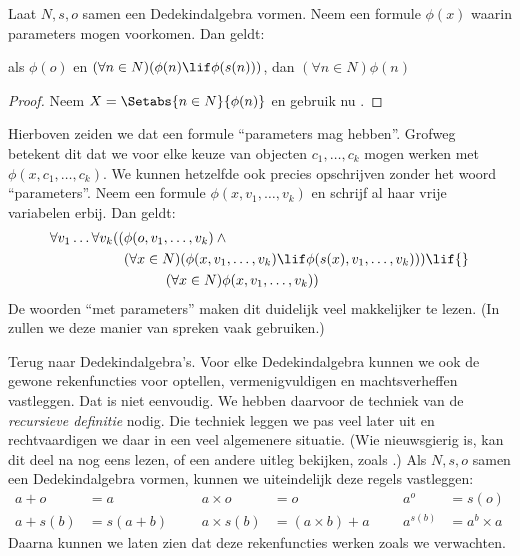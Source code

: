 \documentclass[openany]{memoir}
\begin{document}
\begin{cor}
Laat $N, s, o$ samen een Dedekindalgebra vormen. Neem een formule
$\phi(x)$ waarin parameters mogen voorkomen. Dan geldt:
\begin{center}
	als $\phi(o)$ en $(\forall {n} \in N)(\phi(n)\lif
	\phi({s}({n})))$, {dan} $(\forall n \in N)\phi(n)$
\end{center}
\end{cor}

\begin{proof}
Neem $X = \Setabs{n \in N}{\phi(n)}$ en gebruik nu
.
\end{proof}

Hierboven zeiden we dat een formule ``parameters mag hebben''. Grofweg
betekent dit dat we voor elke keuze van objecten $c_1, \ldots, c_k$
mogen werken met $\phi(x, c_1, \ldots, c_k)$. We kunnen hetzelfde ook
precies opschrijven zonder het woord ``parameters''. Neem een formule
$\phi(x, v_1, \ldots, v_k)$ en schrijf al haar vrije variabelen erbij.
Dan geldt:
	\begin{align*}
			\forall v_1 \ldots \forall v_k((&\phi(o, v_1,\ldots, v_k) \land {}\\
			&	(\forall x \in N)(\phi(x,v_1, \ldots, v_k) \lif \phi(s(x), v_1,\ldots, v_k))) \lif {}\\
			&\hspace{3em} (\forall x \in N)\phi(x, v_1,\ldots, v_k))
	\end{align*}
De woorden ``met parameters'' maken dit duidelijk veel makkelijker te
lezen. (In  zullen we deze manier van spreken vaak
gebruiken.)

Terug naar Dedekindalgebra's. Voor elke Dedekindalgebra kunnen we ook
de gewone rekenfuncties voor optellen, vermenigvuldigen en
machtsverheffen vastleggen. Dat is niet eenvoudig. We hebben daarvoor
de techniek van de \emph{recursieve definitie} nodig. Die techniek
leggen we pas veel later uit en rechtvaardigen we daar in een veel
algemenere situatie. (Wie nieuwsgierig is, kan dit deel na
 nog eens lezen, of een andere uitleg
bekijken, zoals \citealt[pp.~95--8]{Potter2004}.) Als $N, s, o$ samen
een Dedekindalgebra vormen, kunnen we uiteindelijk deze regels
vastleggen:
\begin{align*}
	{a} + {o} &= {a} & & & {a} \times {o} &= {o} & & & {a}^{o} &= s(o)\\
{a} + {s}({b}) &= {s}({a}+{b}) &&& {a} \times {s}({b}) &= ({a}\times {b}) + {a}  & & & {a}^{{s}({b})} &= {a}^{b} \times {a}
\end{align*}
Daarna kunnen we laten zien dat deze rekenfuncties werken zoals we
verwachten.
\endgroup
\end{document}
